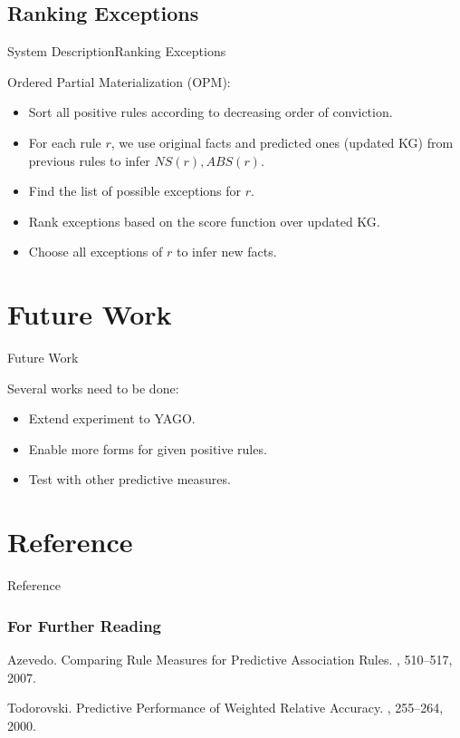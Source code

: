 \documentclass{beamer}
\begin{document}
\subsection{Ranking Exceptions}

\begin{frame}{System Description}{Ranking Exceptions}

Ordered Partial Materialization (OPM):
\begin{itemize}
	\item Sort all positive rules according to decreasing order of conviction.
	\item For each rule $r$, we use original facts and predicted ones (updated KG) from previous rules to infer $NS(r), ABS(r)$.
	\item Find the list of possible exceptions for $r$.
	\item Rank exceptions based on the score function over updated KG.
	\item Choose all exceptions of $r$ to infer new facts.
\end{itemize}

\end{frame}

\section{Future Work}

\begin{frame}{Future Work}

Several works need to be done:

\begin{itemize}
	\item Extend experiment to YAGO.
	\item Enable more forms for given positive rules.
	\item Test with other predictive measures.
\end{itemize}

\end{frame}

\section*{Reference}

\begin{frame}{Reference}
  \frametitle<presentation>{For Further Reading}
    
  \begin{thebibliography}{10}

  \beamertemplatearticlebibitems

    Azevedo.
    \newblock Comparing Rule Measures for Predictive Association Rules.
    , 510--517,
    2007.

    Todorovski.
    \newblock Predictive Performance of Weighted Relative Accuracy.
    , 255--264,
    2000.

  \end{thebibliography}
\end{frame}
\end{document}
